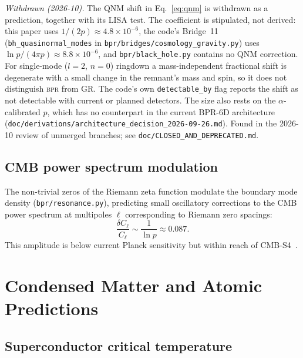 \documentclass[aps,prd,twocolumn,superscriptaddress,longbibliography,nofootinbib]{revtex4-2}
\newcommand{\bpr}{\textsc{bpr}}
\begin{document}
\textit{Withdrawn (2026-10).}  The QNM shift in Eq.~\eqref{eq:qnm}
is withdrawn as a prediction, together with its LISA test.  The
coefficient is stipulated, not derived: this paper uses $1/(2p)
\approx 4.8\times10^{-6}$, the code's Bridge~11
(\texttt{bh\_quasinormal\_modes} in
\texttt{bpr/bridges/cosmology\_gravity.py}) uses $\ln p/(4\pi p)
\approx 8.8\times10^{-6}$, and \texttt{bpr/black\_hole.py} contains
no QNM correction.  For single-mode ($l=2$, $n=0$) ringdown a
mass-independent fractional shift is degenerate with a small change
in the remnant's mass and spin, so it does not distinguish \bpr{}
from GR.  The code's own \texttt{detectable\_by} flag reports the
shift as not detectable with current or planned detectors.  The
size also rests on the $\alpha$-calibrated $p$, which has no
counterpart in the current BPR-6D architecture
(\texttt{doc/derivations/architecture\_decision\_2026-09-26.md}).
Found in the 2026-10 review of unmerged branches; see
\texttt{doc/CLOSED\_AND\_DEPRECATED.md}.

\subsection{CMB power spectrum modulation}

The non-trivial zeros of the Riemann zeta function modulate the
boundary mode density (\texttt{bpr/resonance.py}), predicting small
oscillatory corrections to the CMB power spectrum at multipoles
$\ell$ corresponding to Riemann zero spacings:
\begin{equation}
\frac{\delta C_\ell}{C_\ell} \sim \frac{1}{\ln p} \approx 0.087.
\label{eq:cmb_mod}
\end{equation}
This amplitude is below current Planck sensitivity but within reach
of CMB-S4~\cite{CMBS4}.


\section{Condensed Matter and Atomic Predictions}
\label{sec:cmat}

\subsection{Superconductor critical temperature}
\end{document}
